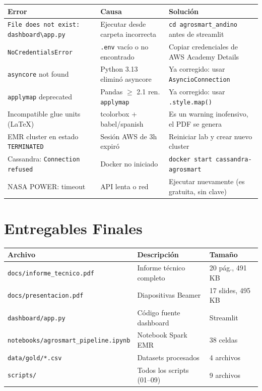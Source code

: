 \documentclass[11pt,a4paper]{article}
\begin{document}
\begin{tabular}{p{4.5cm}p{5cm}p{4.5cm}}
\toprule
\textbf{Error} & \textbf{Causa} & \textbf{Soluci\'on} \\
\midrule
\texttt{File does not exist: dashboard\textbackslash{}app.py} &
Ejecutar desde carpeta incorrecta &
\texttt{cd agrosmart\_andino} antes de streamlit \\
\midrule
\texttt{NoCredentialsError} &
\texttt{.env} vac\'io o no encontrado &
Copiar credenciales de AWS Academy Details \\
\midrule
\texttt{asyncore} not found &
Python 3.13 elimin\'o asyncore &
Ya corregido: usar \texttt{AsyncioConnection} \\
\midrule
\texttt{applymap} deprecated &
Pandas $\ge$ 2.1 ren. \texttt{applymap} &
Ya corregido: usar \texttt{.style.map()} \\
\midrule
Incompatible glue units (LaTeX) &
tcolorbox + babel/spanish &
Es un warning inofensivo, el PDF se genera \\
\midrule
EMR cluster en estado \texttt{TERMINATED} &
Sesi\'on AWS de 3h expir\'o &
Reiniciar lab y crear nuevo cluster \\
\midrule
Cassandra: \texttt{Connection refused} &
Docker no iniciado &
\texttt{docker start cassandra-agrosmart} \\
\midrule
NASA POWER: timeout &
API lenta o red &
Ejecutar nuevamente (es gratuita, sin clave) \\
\bottomrule
\end{tabular}

\section{Entregables Finales}

\begin{tabular}{lll}
\toprule
Archivo & Descripci\'on & Tama\~no \\
\midrule
\texttt{docs/informe\_tecnico.pdf} & Informe t\'ecnico completo & 20 p\'ag., 491 KB \\
\texttt{docs/presentacion.pdf} & Diapositivas Beamer & 17 slides, 495 KB \\
\texttt{dashboard/app.py} & C\'odigo fuente dashboard & Streamlit \\
\texttt{notebooks/agrosmart\_pipeline.ipynb} & Notebook Spark EMR & 38 celdas \\
\texttt{data/gold/*.csv} & Datasets procesados & 4 archivos \\
\texttt{scripts/} & Todos los scripts (01--09) & 9 archivos \\
\bottomrule
\end{tabular}
\end{document}
